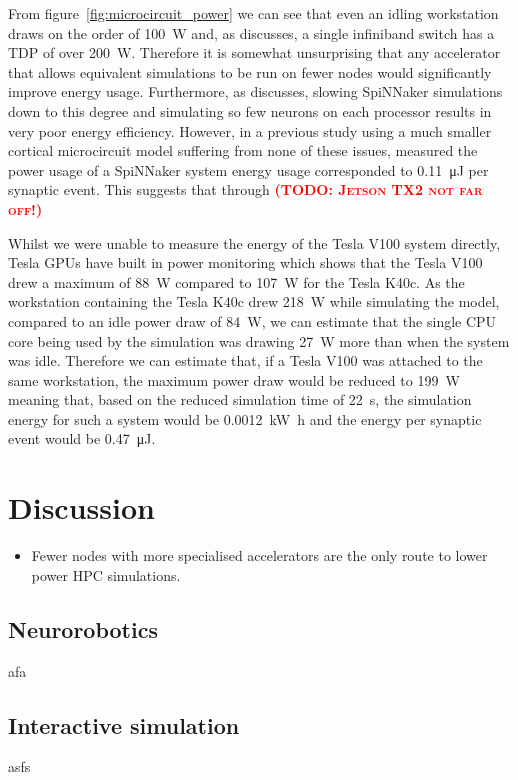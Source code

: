 \documentclass[utf8]{frontiersSCNS} %
\newcommand{\todo}[1]{\textbf{\textsc{\textcolor{red}{(TODO: #1)}}}}
\begin{document}
From figure~\ref{fig:microcircuit_power} we can see that even an idling workstation draws on the order of \SI{100}{\watt} and, as \citeauthor{VanAlbada2018} discusses, a single infiniband switch has a TDP of over \SI{200}{\watt}.
Therefore it is somewhat unsurprising that any accelerator that allows equivalent simulations to be run on fewer nodes would significantly improve energy usage.
Furthermore, as \citeauthor{VanAlbada2018} discusses, slowing SpiNNaker simulations down to this degree and simulating so few neurons on each processor results in very poor energy efficiency.
However, in a previous study using a much smaller cortical microcircuit model suffering from none of these issues, \citet{Sharp2012} measured the power usage of a SpiNNaker system energy usage corresponded to \SI{0.11}{\micro\joule} per synaptic event.
This suggests that through \todo{Jetson TX2 not far off!}

Whilst we were unable to measure the energy of the Tesla V100 system directly, Tesla GPUs have built in power monitoring which shows that the Tesla V100 drew a maximum of \SI{88}{\watt} compared to \SI{107}{\watt} for the Tesla K40c.
As the workstation containing the Tesla K40c drew \SI{218}{\watt} while simulating the model, compared to an idle power draw of \SI{84}{\watt}, we can estimate that the single CPU core being used by the simulation was drawing \SI{27}{\watt} more than when the system was idle.
Therefore we can estimate that, if a Tesla V100 was attached to the same workstation, the maximum power draw would be reduced to \SI{199}{\watt} meaning that, based on the reduced simulation time of \SI{22}{\second}, the simulation energy for such a system would be \SI{0.0012}{\kilo\watt\hour} and the energy per synaptic event would be \SI{0.47}{\micro\joule}.

\section{Discussion}
\begin{itemize}
    \item Fewer nodes with more specialised accelerators are the only route to lower power HPC simulations.
\end{itemize}

\subsection{Neurorobotics}
\label{sec:discussion/neurobotics}
afa

\subsection{Interactive simulation}
asfs
\end{document}
